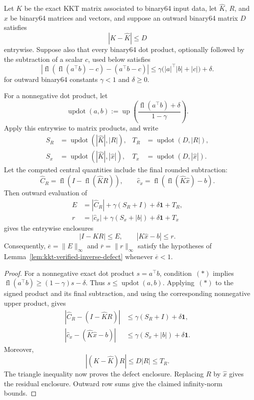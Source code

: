 \begin{lemma}%
\label{lem:kkt-batched-defect-enclosure}
Let \(K\) be the exact KKT matrix associated to binary64 input data, let
\(\widehat K\), \(R\), and \(\widehat x\) be binary64 matrices and vectors,
and suppose an outward binary64 matrix \(D\) satisfies
\[
 |K-\widehat K|\leq D
\]
entrywise.  Suppose also that every binary64 dot product, optionally followed
by the subtraction of a scalar \(c\), used below satisfies
\[
 \left|\operatorname{fl}\!\left(\operatorname{fl}(a^\top b)-c\right)
       -(a^\top b-c)\right|
 \leq \gamma\bigl(|a|^\top|b|+|c|\bigr)+\delta.          \tag{*}
\]
for outward binary64 constants \(\gamma<1\) and \(\delta\geq0\).

For a nonnegative dot product, let
\[
 \operatorname{updot}(a,b)
 :=
 \operatorname{up}\!\left(
   \frac{\operatorname{fl}(a^\top b)+\delta}{1-\gamma}
 \right).
\]
Apply this entrywise to matrix products, and write
\[
 \begin{aligned}
 S_R&=\operatorname{updot}(|\widehat K|,|R|),&
 T_R&=\operatorname{updot}(D,|R|),\\
 S_x&=\operatorname{updot}(|\widehat K|,|\widehat x|),&
 T_x&=\operatorname{updot}(D,|\widehat x|).
 \end{aligned}
\]
Let the computed central quantities include the final rounded subtraction:
\[
 \widehat C_R
 =\operatorname{fl}\!\left(I-\operatorname{fl}(\widehat K R)\right),
 \qquad
 \widehat c_x
 =\operatorname{fl}\!\left(
   \operatorname{fl}(\widehat K\widehat x)-b
 \right).
\]
Then outward evaluation of
\[
 \begin{aligned}
 E&=
   |\widehat C_R|
   +\gamma(S_R+I)+\delta\mathbf 1+T_R,\\
 r&=
   |\widehat c_x|
   +\gamma(S_x+|b|)+\delta\mathbf 1+T_x
 \end{aligned}
\]
gives the entrywise enclosures
\[
 |I-KR|\leq E,\qquad |K\widehat x-b|\leq r.
\]
Consequently,
\(\overline e=\|E\|_\infty\) and
\(\overline r=\|r\|_\infty\) satisfy the hypotheses of
Lemma~\ref{lem:kkt-verified-inverse-defect} whenever
\(\overline e<1\).
\end{lemma}

\begin{proof}
For a nonnegative exact dot product \(s=a^\top b\), condition~\((*)\)
implies
\(\operatorname{fl}(a^\top b)\geq(1-\gamma)s-\delta\).
Thus \(s\leq\operatorname{updot}(a,b)\).
Applying~\((*)\) to the signed product and its final subtraction, and using
the corresponding nonnegative upper product, gives
\[
 \begin{aligned}
 |\widehat C_R-(I-\widehat K R)|
 &\leq\gamma(S_R+I)+\delta\mathbf 1,\\
 |\widehat c_x-(\widehat K\widehat x-b)|
 &\leq\gamma(S_x+|b|)+\delta\mathbf 1.
 \end{aligned}
\]
Moreover,
\[
 |(K-\widehat K)R|\leq D|R|\leq T_R.
\]
The triangle inequality now proves the defect enclosure.  Replacing \(R\)
by \(\widehat x\) gives the residual enclosure.  Outward row sums give the
claimed infinity-norm bounds.
\end{proof}

